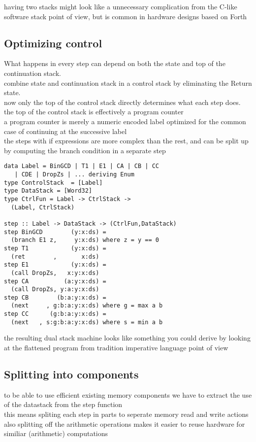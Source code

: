 \documentclass[preprint]{sigplanconf}
\begin{document}
having two stacks might look like a unnecessary complication from the C-like software stack point of view, but is common in hardware designs based on Forth \cite{LaForest}

\subsection{Optimizing control}

What happens in every step can depend on both the state and top of the continuation stack. \\
combine state and continuation stack in a control stack by eliminating the Return state. \\
now only the top of the control stack directly determines what each step does. \\
the top of the control stack is effectively a program counter \\
a program counter is merely a numeric encoded label optimized for the common case of continuing at the successive label \\
the steps with if expressions are more complex than the rest, and can be split up by computing the branch condition in a separate step

\begin{lstlisting}
data Label = BinGCD | T1 | E1 | CA | CB | CC
   | CDE | DropZs | ... deriving Enum
type ControlStack  = [Label]
type DataStack = [Word32]
type CtrlFun = Label -> CtrlStack -> 
  (Label, CtrlStack)

step :: Label -> DataStack -> (CtrlFun,DataStack)
step BinGCD        (y:x:ds) =
  (branch E1 z,     y:x:ds) where z = y == 0
step T1            (y:x:ds) = 
  (ret        ,       x:ds)
step E1            (y:x:ds) = 
  (call DropZs,   x:y:x:ds)
step CA          (a:y:x:ds) = 
  (call DropZs, y:a:y:x:ds)
step CB        (b:a:y:x:ds) = 
  (next     , g:b:a:y:x:ds) where g = max a b
step CC      (g:b:a:y:x:ds) = 
  (next   , s:g:b:a:y:x:ds) where s = min a b
\end{lstlisting}

the resulting dual stack machine looks like something you could derive by looking at the flattened program from tradition imperative language point of view

\subsection{Splitting into components}

to be able to use efficient existing memory components we have to extract the use of the datastack from the step function \\
this means spliting each step in parts to seperate memory read and write actions \\
also splitting off the arithmetic operations makes it easier to reuse hardware for similiar (arithmetic) computations
\end{document}
